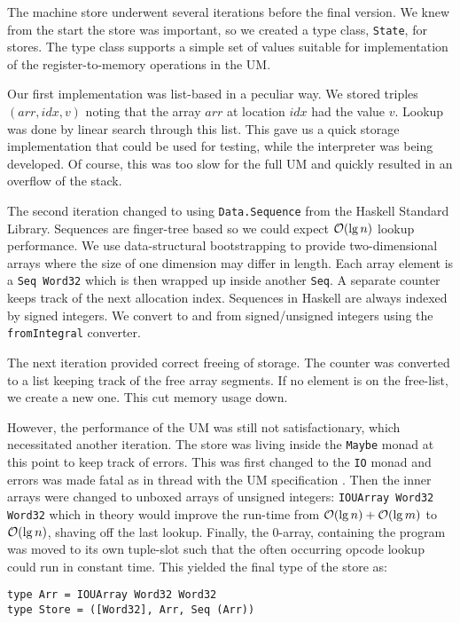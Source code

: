 The machine store underwent several iterations before the final version. We
knew from the start the store was important, so we created a type
class, \texttt{State}, for stores. The type class supports a simple
set of values suitable for implementation of the register-to-memory
operations in the UM.

Our first implementation was list-based in a peculiar way. We stored
triples $(arr, idx, v)$ noting that the array $arr$ at location $idx$
had the value $v$. Lookup was done by linear search through this
list. This gave us a quick storage implementation that could be used
for testing, while the interpreter was being developed. Of course,
this was too slow for the full UM and quickly resulted in an overflow
of the stack.

The second iteration changed to using \texttt{Data.Sequence} from the
Haskell Standard Library. Sequences are finger-tree based so we could
expect $\mathcal{O}(\lg n)$ lookup performance. We use data-structural
bootstrapping \cite{okasaki+pfds} to provide two-dimensional arrays
where the size of one dimension may differ in length. Each array
element is a \texttt{Seq Word32} which is then wrapped up inside
another \texttt{Seq}. A separate counter keeps track of the next
allocation index. Sequences in Haskell are always indexed by signed
integers. We convert to and from signed/unsigned integers using the
\texttt{fromIntegral} converter.

The next iteration provided correct freeing of storage. The counter
was converted to a list keeping track of the free array segments. If
no element is on the free-list, we create a new one. This cut memory
usage down.

However, the performance of the UM was still not satisfactionary, which
necessitated another iteration. The store was living inside the \texttt{Maybe}
monad at this point to keep track of errors. This was first changed to the
\texttt{IO} monad and errors was made fatal as in thread with the UM
specification \cite{um+spec}. Then the inner arrays were changed to
unboxed arrays of unsigned integers: \texttt{IOUArray Word32 Word32}
which in theory would improve the run-time from $\mathcal{O}(\lg n) + \mathcal{O}(\lg
  m)$ to $\mathcal{O}(\lg n)$, shaving off the last lookup. Finally, the
$0$-array, containing the program was moved to its own tuple-slot such
that the often occurring opcode lookup could run in constant
time. This yielded the final type of the store as:
\begin{verbatim}
type Arr = IOUArray Word32 Word32
type Store = ([Word32], Arr, Seq (Arr))
\end{verbatim}

